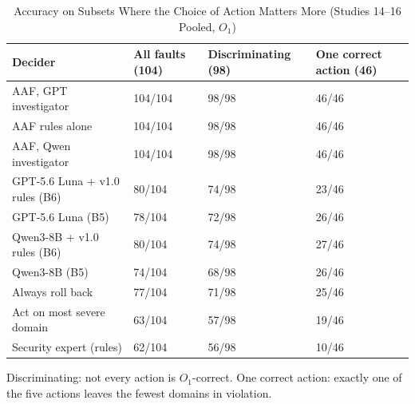 \begin{table}[!t]
\caption{Accuracy on Subsets Where the Choice of Action Matters More (Studies 14--16 Pooled, $O_1$)}
\label{tab:construct}
\centering\footnotesize
\begin{tabular}{L{2.45cm}L{1.2cm}L{1.55cm}L{1.55cm}}
\toprule
\textbf{Decider} & \textbf{All faults (104)} & \textbf{Discriminating (98)} & \textbf{One correct action (46)} \\
\midrule
AAF, GPT investigator & 104/104 & 98/98 & 46/46 \\
AAF rules alone & 104/104 & 98/98 & 46/46 \\
AAF, Qwen investigator & 104/104 & 98/98 & 46/46 \\
GPT-5.6 Luna + v1.0 rules (B6) & 80/104 & 74/98 & 23/46 \\
GPT-5.6 Luna (B5) & 78/104 & 72/98 & 26/46 \\
Qwen3-8B + v1.0 rules (B6) & 80/104 & 74/98 & 27/46 \\
Qwen3-8B (B5) & 74/104 & 68/98 & 26/46 \\
Always roll back & 77/104 & 71/98 & 25/46 \\
Act on most severe domain & 63/104 & 57/98 & 19/46 \\
Security expert (rules) & 62/104 & 56/98 & 10/46 \\
\bottomrule
\end{tabular}
\par\vspace{2pt}\raggedright\scriptsize Discriminating: not every action is $O_1$-correct. One correct action: exactly one of the five actions leaves the fewest domains in violation.
\end{table}
